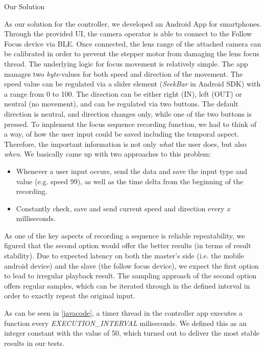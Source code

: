 \documentclass{sigchi}
\begin{document}
Our Solution

As our solution for the controller, we developed an Android App for smartphones. Through the provided UI, the camera operator is able to connect to the Follow Focus device via BLE. 
Once connected, the lens range of the attached camera can be calibrated in order to prevent the stepper motor from damaging the lens focus thread.
The underlying logic for focus movement is relatively simple. The app manages two \textit{byte}-values for both speed and direction of the movement.
The speed value can be regulated via a slider element (\textit{SeekBar} in Android SDK) with a range from 0 to 100. The direction can be either right (IN), left (OUT) or neutral (no movement), and can be regulated via two buttons. The default direction is neutral, and direction changes only, while one of the two buttons is pressed.  \newline
To implement the focus sequence recording function, we had to think of a way, of how the user input could be saved including the temporal aspect. Therefore, the important information is not only \textit{what} the user does, but also \textit{when}. We basically came up with two approaches to this problem: \newline
\begin{itemize}
  \item Whenever a user input occurs, send the data and save the input type and value (e.g. speed 99), as well as the time delta from the beginning of the recording.
  \item Constantly check, save and send current speed and direction every \textit{x} milliseconds.
\end{itemize}

As one of the key aspects of recording a sequence is reliable repeatability, we figured that the second option would offer the better results (in terms of result stability). Due to expected latency on both the master's side (i.e. the mobile android device) and the slave (the follow focus device), we expect the first option to lead to irregular playback result. \newline
The sampling approach of the second option offers regular samples, which can be iterated through in the defined interval in order to exactly repeat the original input.



As can be seen in \autoref{javacode}, a timer thread in the controller app executes a function every \textit{EXECUTION\_INTERVAL} miliseconds. We defined this as an integer constant with the value of 50, which turned out to deliver the most stable results in our tests. 
\end{document}
